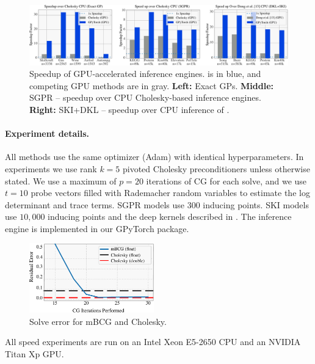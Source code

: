 \begin{figure}[t]
  \includegraphics[width=\textwidth]{chapters/bbmm/figures/sparse_gp_results}
  \caption{
    Speedup of GPU-accelerated inference engines.
    \mmacro{} is in blue, and competing GPU methods are in gray.
    {\bf Left:} Exact GPs. {\bf Middle:} SGPR \cite{titsias2009variational,hensman2013gaussian} -- speedup over CPU Cholesky-based inference engines.
    {\bf Right:} SKI+DKL \cite{wilson2015kernel,wilson2016deep} -- speedup over CPU inference of \citet{dong2017scalable}.
  }
  \label{fig:timing_results}
\end{figure}

\paragraph{Experiment details.} All methods use the same optimizer (Adam) with identical hyperparameters.
In \mmacro{} experiments we use rank $k\!=\!5$ pivoted Cholesky preconditioners unless otherwise stated.
We use a maximum of $p\!=\!20$ iterations of CG for each solve, and
we use $t\!=\!10$ probe vectors filled with Rademacher random variables to estimate the log determinant and trace terms.
SGPR models use $300$ inducing points.
SKI models use $10,\!000$ inducing points and  the deep kernels described in \cite{wilson2016deep}.
The \mmacro{} inference engine is implemented in our GPyTorch package.
\begin{figure}[t!]
  \begin{center}
    \includegraphics[width=0.48\textwidth]{chapters/bbmm/figures/cg_error}
  \end{center}
  \caption{Solve error for mBCG and Cholesky. \label{fig:cg_error}}
\end{figure}
All speed experiments are run on an Intel Xeon E5-2650 CPU and an NVIDIA Titan Xp GPU.

